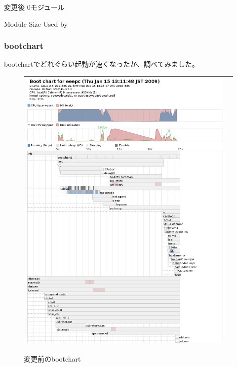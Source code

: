 \documentclass[mingoth,a4paper]{jsarticle}
\begin{document}
\begin{multicols}{2}
 変更後 0モジュール
\begin{commandline}
Module                  Size  Used by
\end{commandline}
 
\end{multicols}


\subsubsection{bootchart}
bootchartでどれぐらい起動が速くなったか、調べてみました。

\begin{figure}[htbp]
  \begin{tabular}{cc}
   \begin{minipage}{0.5\textwidth}
    \begin{center}
     \includegraphics[scale=0.45]{image200901/bootchart-eeepc.png}
     \caption{変更前のbootchart}
     \label{fig:bootchart-eeepc}
     

\end{center}
\end{minipage}
\end{tabular}
\end{figure}
\end{document}
